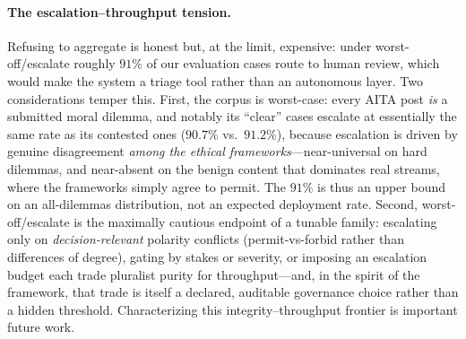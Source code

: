 \paragraph{The escalation--throughput tension.} Refusing to aggregate is honest but, at the
limit, expensive: under worst-off/escalate roughly $91\%$ of our evaluation cases route to
human review, which would make the system a triage tool rather than an autonomous layer. Two
considerations temper this. First, the corpus is worst-case: every AITA post \emph{is} a
submitted moral dilemma, and notably its ``clear'' cases escalate at essentially the same rate
as its contested ones ($90.7\%$ vs.\ $91.2\%$), because escalation is driven by genuine
disagreement \emph{among the ethical frameworks}---near-universal on hard dilemmas, and
near-absent on the benign content that dominates real streams, where the frameworks simply
agree to permit. 
The $91\%$ is thus an upper bound on an all-dilemmas distribution, not an
expected deployment rate. Second, worst-off/escalate is the maximally cautious endpoint of a
tunable family: escalating only on \emph{decision-relevant} polarity conflicts (permit-vs-forbid
rather than differences of degree), gating by stakes or severity, or imposing an escalation
budget each trade pluralist purity for throughput---and, in the spirit of the framework, that
trade is itself a declared, auditable governance choice rather than a hidden threshold.
Characterizing this integrity--throughput frontier is important future work.

